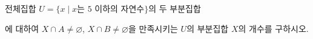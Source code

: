 전체집합 $U=\{x \mid x$는 $5$ 이하의 자연수$\}$의 두 부분집합 \par\smallskip{}\par\smallskip\noindent 에 대하여 $X\cap A\ne\varnothing$, $X\cap B\ne\varnothing$을 만족시키는 $U$의 부분집합 $X$의 개수를 구하시오.
